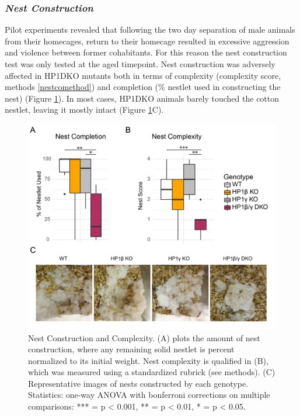 \documentclass[onehalf,12pt]{beavtex}
\begin{document}
  \FloatBarrier
  
  \subsubsection*{\texorpdfstring{\emph{Nest
  Construction}}{Nest Construction}}\label{nest-construction}
  
  Pilot experiments revealed that following the two day separation of male
  animals from their homecages, return to their homecage resulted in
  excessive aggression and violence between former cohabitants. For this
  reason the nest construction test was only tested at the aged timepoint.
  Nest construction was adversely affected in HP1DKO mutants both in terms
  of complexity (complexity score, methods \ref{nestcomethod}) and
  completion (\% nestlet used in constructing the nest) (Figure
  \ref{fig:Nestconstruction}). In most cases, HP1DKO animals barely
  touched the cotton nestlet, leaving it mostly intact (Figure
  \ref{fig:Nestconstruction}C).
  
  \begin{figure}
  
  {\centering \includegraphics[width=1\linewidth, ]{./figure/results/Nest} 
  
  }
  
  \caption[Nest Construction Test]{Nest Construction and Complexity.  (A) plots the amount of nest construction, where any remaining solid nestlet is percent normalized to its initial weight.  Nest complexity is qualified in (B), which was measured using a standardized rubrick (see methods). (C) Representative images of nests constructed by each genotype. Statistics: one-way ANOVA with bonferroni corrections on multiple comparisons: *** = p < 0.001, ** = p < 0.01, * = p < 0.05.}\label{fig:Nestconstruction}
  \end{figure}
  
\end{document}
